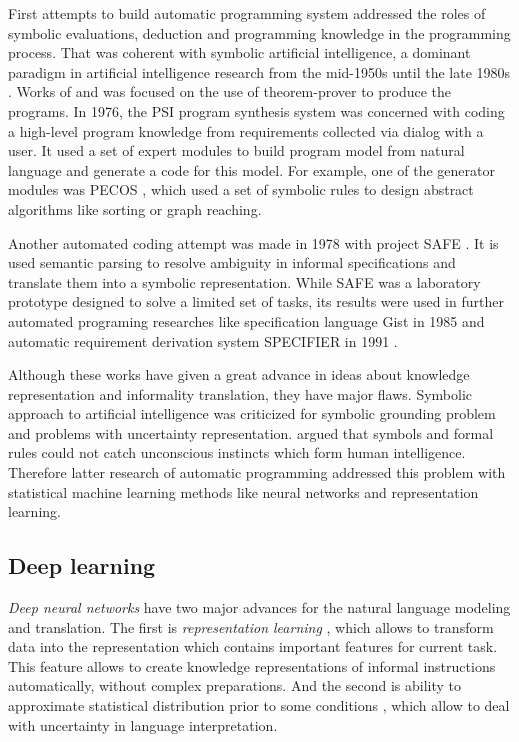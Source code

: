 First attempts to build automatic programming system addressed the roles of symbolic evaluations, deduction and programming knowledge in the programming process. That was coherent with symbolic artificial intelligence, a dominant paradigm in artificial intelligence research from the mid-1950s until the late 1980s \parencite{haugeland1989artificial}. Works of \cite{green1969application} and \cite{Lee1974} was focused on the use of theorem-prover to produce the programs. In 1976, the PSI program synthesis system \parencite{green1976design, green1977summary} was concerned with coding a high-level program knowledge from requirements collected via dialog with a user. It used a set of expert modules to build program model from natural language and generate a code for this model. For example, one of the generator modules was PECOS \parencite{barstow1979experiment}, which used a set of symbolic rules to design abstract algorithms like sorting or graph reaching. 

Another automated coding attempt was made in 1978 with project SAFE \parencite{balzer1978informality}. It is used semantic parsing to resolve ambiguity in informal specifications and translate them into a symbolic representation. While SAFE was a laboratory prototype designed to solve a limited set of tasks, its results were used in further automated programing researches like specification language Gist \parencite{Balzer1985} in 1985 and automatic requirement derivation system SPECIFIER in 1991 \parencite{Miriyala1991}.

Although these works have given a great advance in ideas about knowledge representation and informality translation, they have major flaws. Symbolic approach to artificial intelligence was criticized \parencite{mcdermott1987critique, harnad1990symbol} for symbolic grounding problem and problems with uncertainty representation. \cite{dreyfus1994computers} argued that symbols and formal rules could not catch unconscious instincts which form human intelligence. Therefore latter research of automatic programming addressed this problem with statistical machine learning methods like neural networks and representation learning.

\subsection{Deep learning} 
\emph{Deep neural networks} have two major advances for the natural language modeling and translation. The first is \emph{representation learning} \parencite{Bengio2013}, which allows to transform data into the representation which contains important features for current task. This feature allows to create knowledge representations of informal instructions automatically, without complex preparations. And the second is ability to approximate statistical distribution prior to some conditions \parencite{white1992artificial}, which allow to deal with uncertainty in language interpretation. 

